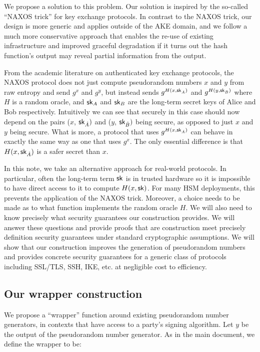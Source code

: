 \documentclass[12pt]{article}
\begin{document}
We propose a solution to this problem. Our solution is inspired by the
so-called ``NAXOS trick'' for key exchange protocols. In contrast to the
NAXOS trick, our design is more generic and applies outside of the AKE
domain, and we follow a much more conservative approach that enables the
re-use of existing infrastructure and improved graceful degradation if
it turns out the hash function's output may reveal partial information
from the output.

From the academic literature on authenticated key exchange protocols, the NAXOS protocol \cite{LaMacchiaeCK2007} does not just compute pseudorandom numbers $x$ and $y$ from raw entropy and send $g^{x}$ and $g^{y}$, but instead sends $g^{H(x, \mathsf{sk}_{\hat A})}$ and $g^{H(y, \mathsf{sk}_{\hat B})}$ where $H$ is a random oracle, and $\mathsf{sk}_{A}$ and $\mathsf{sk}_{B}$ are the long-term secret keys of Alice and Bob respectively. Intuitively we can see that securely in this case should now depend on the pairs ($x$, $\mathsf{sk}_{\hat A})$ and ($y$, $\mathsf{sk}_{\hat B})$ being secure, as opposed to just $x$ and $y$ being secure. What is more, a protocol that uses $g^{H(x, \mathsf{sk}_{\hat A})}$ can behave in exactly the same way as one that uses $g^x$. The only essential difference is that $H(x, \mathsf{sk}_{\hat A})$ is a safer secret than $x$.

In this note, we take an alternative approach for real-world protocols.
In particular, often the long-term term $\mathsf{sk}$ is in trusted hardware so
it is impossible to have direct access to it to compute $H(x, \mathsf{sk})$.
For many HSM deployments, this prevents the application of the NAXOS
trick.
Moreover, a choice needs to be made as to what function implements the
random oracle $H$. We will also need to know precisely what security
guarantees our construction provides.  We will answer these questions
and provide proofs that are construction meet precisely definition
security guarantees under standard cryptographic assumptions. We will
show that our construction improves the generation of pseudorandom
numbers and provides concrete security guarantees for a generic class of
protocols including SSL/TLS, SSH, IKE, etc. at negligible cost to efficiency. 

\subsection*{Our wrapper construction}

We propose a ``wrapper'' function around existing
pseudorandom number generators, in contexts that have access to a
party's signing algorithm. Let $y$ be the output of the pseudorandom
number generator. As in the main document, we define the wrapper to be:
\end{document}
